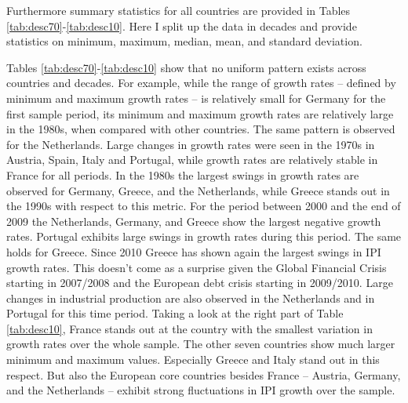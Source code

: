 \documentclass[12pt,letterpaper,fleqn]{article}           %
\begin{document}
Furthermore summary statistics for all countries are provided in Tables \ref{tab:desc70}-\ref{tab:desc10}. Here I split up the data in decades and provide statistics on minimum, maximum, median, mean, and standard deviation.  

Tables \ref{tab:desc70}-\ref{tab:desc10} show that no uniform pattern exists across countries and decades. For example, while the range of growth rates -- defined by minimum and maximum growth rates -- is relatively small for Germany for the first sample period, its minimum and maximum growth rates are relatively large in the 1980s, when compared with other countries. The same pattern is observed for the Netherlands. Large changes in growth rates were seen in the 1970s in Austria, Spain, Italy and Portugal, while growth rates are relatively stable in France for all periods. In the 1980s the largest swings in growth rates are observed for Germany, Greece, and the Netherlands, while Greece stands out in the 1990s with respect to this metric. 
For the period between 2000 and the end of 2009 the Netherlands, Germany, and Greece show the largest negative growth rates. Portugal exhibits large swings in growth rates during this period. The same holds for Greece. Since 2010 Greece has shown again the largest swings in IPI growth rates. This doesn't come as a surprise given the Global Financial Crisis starting in 2007/2008 and the European debt crisis starting in 2009/2010. Large changes in industrial production are also observed in the Netherlands and in Portugal for this time period. Taking a look at the right part of Table \ref{tab:desc10}, France stands out at the country with the smallest variation in growth rates over the whole sample. The other seven countries show much larger minimum and maximum values. Especially Greece and Italy stand out in this respect. But also the European core countries besides France -- Austria, Germany, and the Netherlands -- exhibit strong fluctuations in IPI growth over the sample.
\end{document}
